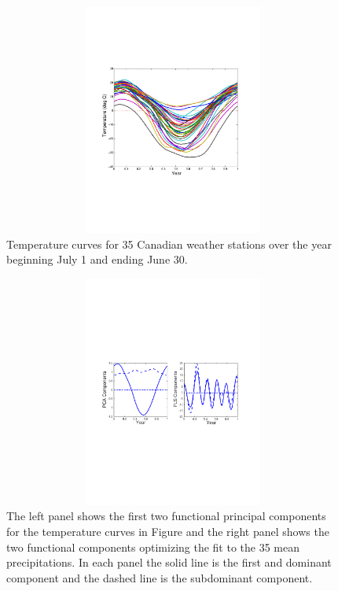 \documentclass[12pt]{article}
\begin{document}
\begin{figure}
  \includegraphics[height=3in, width=6in]{figs/Daily_TempData}
  \caption{Temperature curves for 35 Canadian weather stations over the year beginning July 1 and ending June 30.}
  \label{Temperature}
\end{figure}

\begin{figure}
  \includegraphics[height=3in, width=6in]{figs/Daily_PCA_PLS_Components}
  \caption{The left panel shows the first two functional principal components for the temperature curves in Figure \label{Temperature} and the right panel shows the two functional components optimizing the fit to the 35 mean precipitations.  In each panel the solid line is the first and dominant component and the dashed line is the subdominant component.}
  \label{Daily_PCA_PLS_Components}
\end{figure}
\end{document}
